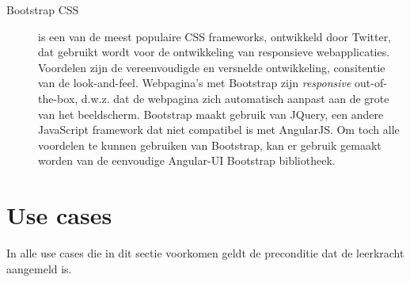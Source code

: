 \documentclass[a4paper]{article}
\begin{document}
\begin{description}
    \item[Bootstrap CSS] is een van de meest populaire CSS frameworks, ontwikkeld door Twitter, dat gebruikt wordt voor de ontwikkeling van responsieve webapplicaties. Voordelen zijn de vereenvoudigde en versnelde ontwikkeling, consitentie van de look-and-feel. Webpagina's met Bootstrap zijn \textit{responsive} out-of-the-box, d.w.z. dat de webpagina zich automatisch aanpast aan de grote van het beeldscherm.
    Bootstrap maakt gebruik van JQuery, een andere JavaScript framework dat niet compatibel is met AngularJS. Om toch alle voordelen te kunnen gebruiken van Bootstrap, kan er gebruik gemaakt worden van de eenvoudige Angular-UI \cite{AngularUI} Bootstrap bibliotheek.
\end{description}



\clearpage
\section{Use cases} \label{sec:use_cases}


In alle use cases die in dit sectie voorkomen geldt de preconditie dat de leerkracht aangemeld is.
\end{document}
